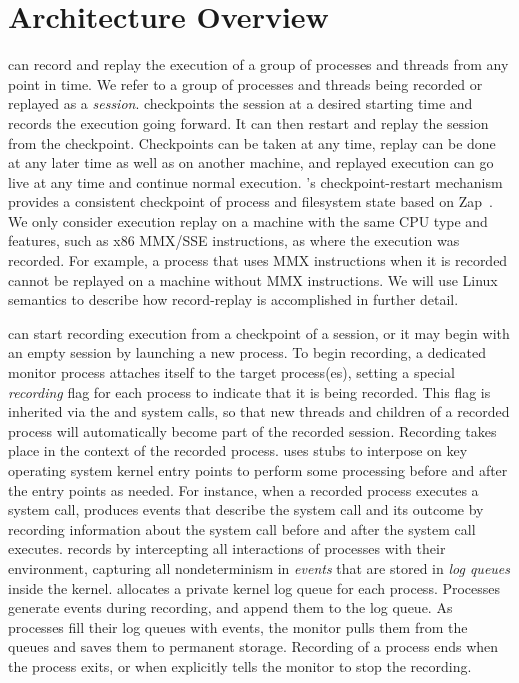 \section{Architecture Overview}
\label{scribe:sec:arch}

\scribe{} can record and replay the execution of a group of processes
and threads from any point in time.  We refer to a group of processes
and threads being recorded or replayed as a {\em session}.  \scribe{}
checkpoints the session at a desired starting time and records the
execution going forward.  It can then restart and replay the
session from the checkpoint.  Checkpoints can be taken at any time,
replay can be done at any later time as well as on another
machine, and replayed execution can go live at any time and continue
normal execution.  \scribe{}'s checkpoint-restart mechanism
provides a consistent checkpoint of process and filesystem state
based on Zap~\cite{dejaview,zap07,zap02}.
We only consider
execution replay on a machine with the same CPU type and features,
such as x86 MMX/SSE instructions, as where the execution was recorded.
For example, a process that uses MMX instructions when it is
recorded cannot be replayed on a machine without MMX instructions.   
We will use Linux semantics to describe how
record-replay is accomplished in further detail.

\scribe{} can start recording execution from a checkpoint of a
session, or it may begin with an empty session by launching a new
process.  To begin recording, a dedicated monitor process attaches
itself to the target process(es), setting a special {\em recording}
flag for each process to indicate that it is being recorded.  This flag is 
inherited via the  and  system calls, so that
new threads and children of a recorded process will automatically
become part of the recorded session.  Recording takes place in the
context of the recorded process.  \scribe{} uses
stubs to interpose on key operating system kernel entry points to
perform some processing before and after the entry points as needed.
For instance, when a recorded process executes a 
system call, \scribe{} produces events that describe the system
call and its outcome by recording information about the system call
before and after the system call executes.
\scribe{} records by intercepting all
interactions of processes with their environment, capturing
all nondeterminism in {\em events} that are stored in {\em log queues}
inside the kernel.  \scribe{} allocates a private kernel log queue for
each process.  Processes generate events during recording, and
append them to the log queue.  As processes fill their log queues
with events, the monitor pulls them from the queues and
saves them to permanent storage. Recording of a process ends when
the process exits, or when \scribe{} explicitly tells the monitor to
stop the recording.  

